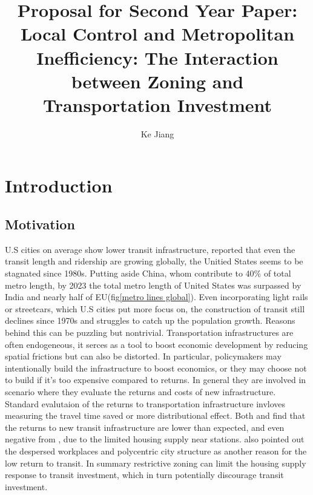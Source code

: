 \documentclass[12pt, a4paper]{article}
\title{Proposal for Second Year Paper: Local Control and Metropolitan Inefficiency: The Interaction between Zoning and Transportation Investment}
\author{Ke Jiang}
\date{}
\begin{document}
\maketitle


\section{Introduction}
\subsection{Motivation}
U.S cities on average show lower transit infrastructure, \cite{Freemark2023-jh} reported that even the transit length and ridership are growing globally, the Unitied States seems to be stagnated since 1980s. Putting aside China, whom contribute to 40\% of total metro length, by 2023 the total metro length of United States was surpassed by India and nearly half of EU(fig\ref{metro lines global}). Even incorporating light rails or streetcars, which U.S cities put more focus on, the construction of transit still declines since 1970s and struggles to catch up the population growth. Reasons behind this can be puzzling but nontrivial. Transportation infrastructures are often endogeneous, it serces as a tool to boost economic development by reducing spatial frictions but can also be distorted\citep{Donaldson2025-wa}. In particular, policymakers may intentionally build the infrastructure to boost economics, or they may choose not to build if it's too expensive compared to returns. In general they are involved in scenario where they evaluate the returns and costs of new infrastructure. Standard evalutaion of the returns to transportation infrastructure invloves measuring the travel time saved or more distributional effect\citep{Fogel1964-pu,Tsivanidis2023-hs,Severen2021-oi}. Both \textcite{Tsivanidis2023-hs} and \textcite{Severen2021-oi} find that the returns to new transit infrastructure are lower than expected, and even negative from \textcite{Severen2021-oi}, due to the limited housing supply near stations. \textcite{Severen2021-oi} also pointed out the despersed workplaces and polycentric city structure as another reason for the low return to transit.  In summary restrictive zoning can limit the housing supply response to transit investment, which in turn potentially discourage transit investment. 
\end{document}
